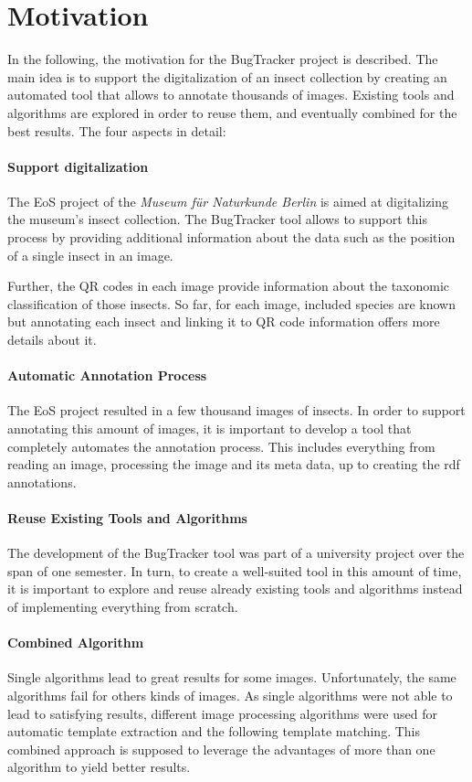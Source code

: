 %
\section{Motivation}
\label{sec_motivation}

In the following, the motivation for the BugTracker project is described. 
The main idea is to support the digitalization of an insect collection by creating an automated tool that allows to annotate thousands of images.
Existing tools and algorithms are explored in order to reuse them, and eventually combined for the best results. The four aspects in detail:

\paragraph{Support digitalization}
The EoS project of the \emph{Museum für Naturkunde Berlin} is aimed at digitalizing the museum's insect collection.
The BugTracker tool allows to support this process by providing additional information about the data such as the position of a single insect in an image.

Further, the QR codes in each image provide information about the taxonomic classification of those insects.
So far, for each image, included species are known but annotating each insect and linking it to QR code information offers more details about it. 

\paragraph{Automatic Annotation Process}
The EoS project resulted in a few thousand images of insects.
In order to support annotating this amount of images, it is important to develop a tool that completely automates the annotation process.
This includes everything from reading an image, processing the image and its meta data, up to creating the rdf annotations.

\paragraph{Reuse Existing Tools and Algorithms}
The development of the BugTracker tool was part of a university project over the span of one semester. 
In turn, to create a well-suited tool in this amount of time, it is important to explore and reuse already existing tools and algorithms instead of implementing everything from scratch.

\paragraph{Combined Algorithm}
Single algorithms lead to great results for some images.
Unfortunately, the same algorithms fail for others kinds of images.
As single algorithms were not able to lead to satisfying results, different image processing algorithms were used for automatic template extraction and the following template matching.
This combined approach is supposed to leverage the advantages of more than one algorithm to yield better results.
